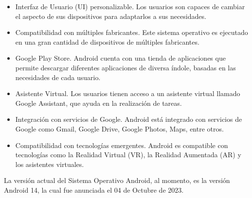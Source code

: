 \begin{itemize}

    \item Interfaz de Usuario (UI) personalizable. Los usuarios son capaces de cambiar el aspecto de sus dispositivos para adaptarlos a sus necesidades.
    \item Compatibilidad con múltiples fabricantes. Este sistema operativo es ejecutado en una gran cantidad de dispositivos de múltiples fabricantes.
    \item Google Play Store. Android cuenta con una tienda de aplicaciones que permite descargar diferentes aplicaciones de diversa índole, basadas en las necesidades de cada usuario.
    \item Asistente Virtual. Los usuarios tienen acceso a un asistente virtual llamado Google Assistant, que ayuda en la realización de tareas.
    \item Integración con servicios de Google. Android está integrado con servicios de Google como Gmail, Google Drive, Google Photos, Maps, entre otros.
    \item Compatibilidad con tecnologías emergentes. Android es compatible con tecnologías como la Realidad Virtual (VR), la Realidad Aumentada (AR) y los asistentes virtuales. 
\end{itemize}

La versión actual del Sistema Operativo Android, al momento, es la versión Android 14, la cual fue anunciada el 04 de Octubre de 2023.